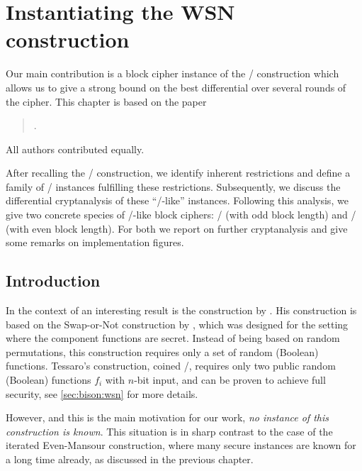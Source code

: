 \chapter{Instantiating the WSN construction}\label{ch:bison}

\vspace*{-\baselineskip}
\hspace{1.5em}
Our main contribution is a block cipher instance of the \WSN/ construction which allows us to give a strong bound on the best differential over several rounds of the cipher.
This chapter is based on the paper
\begin{quote}
    .
\end{quote}
All authors contributed equally.

After recalling the \WSN/ construction, we identify inherent restrictions and define a family of \WSN/ instances fulfilling these restrictions.
Subsequently, we discuss the differential cryptanalysis of these \enquote{\bison/-like} instances.
Following this analysis, we give two concrete species of \bison/-like block ciphers: \bison/ (with odd block length) and \wisent/ (with even block length).
For both we report on further cryptanalysis and give some remarks on implementation figures.

\section{Introduction}

In the context of  an interesting result is the construction by \textcite{AC:Tessaro15}.
His construction is based on the Swap-or-Not construction by \textcite{C:HoaMorRog12}, which was designed for the setting where the component functions are secret.
Instead of being based on random permutations, this construction requires only a set of random (Boolean) functions.
Tessaro's construction, coined \WSNf/, requires only two public random (Boolean) functions $f_i$ with $n$-bit input, and can be proven to achieve full security, see \cref{sec:bison:wsn} for more details.

However, and this is the main motivation for our work, \emph{no instance of this construction is known}.
This situation is in sharp contrast to the case of the iterated Even-Mansour construction, where many secure instances are known for a long time already, as discussed in the previous chapter.


